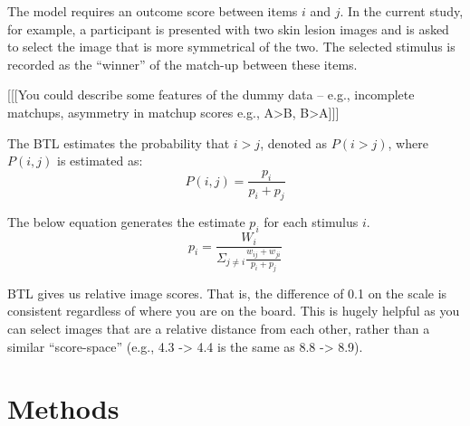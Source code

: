\documentclass[a4paper, natbib, doc, 12pt]{apa7}
\begin{document}
The model requires an outcome score between items $i$ and $j$. In the current study, for example, a participant is presented with two skin lesion images and is asked to select the image that is more symmetrical of the two. The selected stimulus is recorded as the ``winner'' of the match-up between these items. 


[[[You could describe some features of the dummy data -- e.g., incomplete matchups, asymmetry in matchup scores e.g., A>B, B>A]]]

The BTL estimates the probability that $i > j$, denoted as $P(i>j)$, where $P(i,j)$ is estimated as: 
\begin{equation}
    P(i, j) = \frac{p_{i}}{p_{i} + p_{j}}
\end{equation}

The below equation generates the estimate $p_{i}$ for each stimulus $i$.
\begin{equation}
    p_{i} = \frac{W_{i}}{\Sigma_{j\neq i}\frac{w_{ij}+w_{ji}}{p_{i}+p_{j}}}
\end{equation}

BTL gives us relative image scores. That is, the difference of 0.1 on the scale is consistent regardless of where you are on the board. This is hugely helpful as you can select images that are a relative distance from each other, rather than a similar ``score-space'' (e.g., 4.3 -> 4.4 is the same as 8.8 -> 8.9).

\section{Methods}
\end{document}

